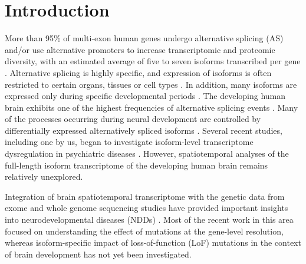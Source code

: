\documentclass[12pt,chapterheads,final]{ucsd}
\begin{document}
%



%   
%   
%

\chapter{Introduction}
More than 95\% of multi-exon human genes undergo alternative splicing (AS) and/or use alternative promoters to increase transcriptomic and proteomic diversity, with an estimated average of five to seven isoforms transcribed per gene \cite{Wang2008,Pan2008,Steijger2013}. Alternative splicing is highly specific, and expression of isoforms is often restricted to certain organs, tissues or cell types \cite{Trapnell2010,Barbosa-Morais2012,Sapkota2019,Shalek2013}. In addition, many isoforms are expressed only during specific developmental periods \cite{Kalsotra2011}. The developing human brain exhibits one of the highest frequencies of alternative splicing events \cite{Yeo2004,Calarco2011,Mele2015,Raj2015}. Many of the processes occurring during neural development are controlled by differentially expressed alternatively spliced isoforms \cite{Li2007,Kim2013,Grabowski2011}. Several recent studies, including one by us, began to investigate isoform-level transcriptome dysregulation in psychiatric diseases \cite{Parikshak2016,Gandal2018,Li2018}. However, spatiotemporal analyses of the full-length isoform transcriptome of the developing human brain remains relatively unexplored. \par
Integration of brain spatiotemporal transcriptome with the genetic data from exome and whole genome sequencing studies have provided important insights into neurodevelopmental diseases (NDDs) \cite{Parikshak2013,Willsey2013,Lin2015,Li2018,Satterstrom2019}. Most of the recent work in this area focused on understanding the effect of mutations at the gene-level resolution, whereas isoform-specific impact of loss-of-function (LoF) mutations in the context of brain development has not yet been investigated. \par
\end{document}
